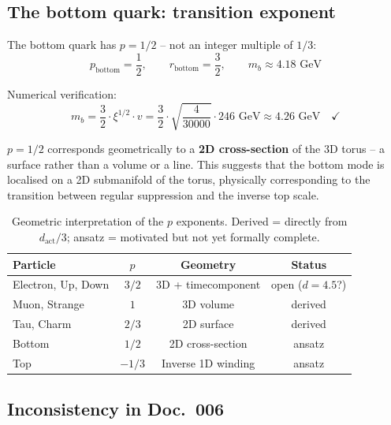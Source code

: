 \subsection{The bottom quark: transition exponent}

The bottom quark has $p = 1/2$ -- not an integer multiple of $1/3$:
\begin{equation}
    p_{\text{bottom}} = \frac{1}{2}, \qquad
    r_{\text{bottom}} = \frac{3}{2}, \qquad
    m_b \approx 4.18 \text{ GeV}
\end{equation}

Numerical verification:
\begin{equation}
    m_b = \frac{3}{2} \cdot \xi^{1/2} \cdot v
    = \frac{3}{2} \cdot \sqrt{\frac{4}{30000}} \cdot 246 \text{ GeV}
    \approx 4.26 \text{ GeV} \quad \checkmark
\end{equation}

$p = 1/2$ corresponds geometrically to a \textbf{2D cross-section}
of the 3D torus -- a surface rather than a volume or a line. This
suggests that the bottom mode is localised on a 2D submanifold of
the torus, physically corresponding to the transition between regular
suppression and the inverse top scale.

\begin{table}[htbp]
\centering\small
\begin{tabular}{lccc}
\toprule
\textbf{Particle} & $p$ & \textbf{Geometry} & \textbf{Status} \\
\midrule
Electron, Up, Down & $3/2$ & 3D + time\-component & open ($d=4.5$?) \\
Muon, Strange      & $1$   & 3D volume            & derived \\
Tau, Charm         & $2/3$ & 2D surface           & derived \\
Bottom             & $1/2$ & 2D cross-section     & ansatz \\
Top                & $-1/3$& Inverse 1D winding   & ansatz \\
\bottomrule
\end{tabular}
\caption{Geometric interpretation of the $p$ exponents.
Derived = directly from $d_{\text{act}}/3$; ansatz = motivated
but not yet formally complete.}
\label{tab:p_geometry}
\end{table}

\subsection{Inconsistency in Doc.~006}

